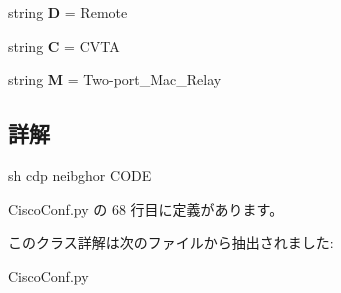 \begin{DoxyCompactItemize}
string {\bfseries D} = \textquotesingle{}Remote\textquotesingle{}
\item 
\mbox{\label{classCiscoConf_1_1eCdpneiCode_ac78887d0f632cdf9618004592106cfdc}} 
string {\bfseries C} = \textquotesingle{}C\+V\+TA\textquotesingle{}
\item 
\mbox{\label{classCiscoConf_1_1eCdpneiCode_ada93837aeffd9e643b2d504cf4c845fc}} 
string {\bfseries M} = \textquotesingle{}Two-\/port\+\_\+\+Mac\+\_\+\+Relay\textquotesingle{}
\end{DoxyCompactItemize}


\subsection{詳解}
\begin{DoxyVerb}sh cdp neibghor CODE
\end{DoxyVerb}
 

 Cisco\+Conf.\+py の 68 行目に定義があります。



このクラス詳解は次のファイルから抽出されました\+:\begin{DoxyCompactItemize}
\item 
Cisco\+Conf.\+py\end{DoxyCompactItemize}

